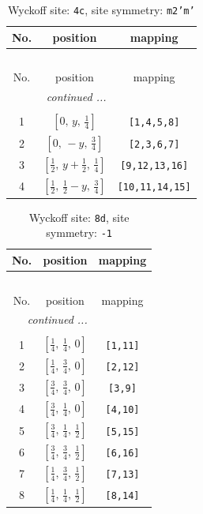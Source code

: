 \documentclass[fleqn,8pt]{jsarticle}
\begin{document}
\renewcommand{\arraystretch}{1.2}
\begin{longtable}{ccc}
\caption{Wyckoff site: {\tt 4c}, site symmetry: {\tt m2'm'}}
 \\
 \hline \hline
No. & position & mapping \\ \hline \endfirsthead

\multicolumn{2}{l}{\tablename\ \thetable{}} \\
 \hline \hline
No. & position & mapping \\ \hline \endhead

 \hline \hline
\multicolumn{2}{r}{\footnotesize\it continued ...} \\ \endfoot

 \hline \hline
\multicolumn{2}{r}{} \\ \endlastfoot

1 & $\left[ 0,\, y,\, \frac{1}{4} \right]$ & {\tt [1,4,5,8]} \\ \hline
2 & $\left[ 0,\, - y,\, \frac{3}{4} \right]$ & {\tt [2,3,6,7]} \\ \hline
3 & $\left[ \frac{1}{2},\, y + \frac{1}{2},\, \frac{1}{4} \right]$ & {\tt [9,12,13,16]} \\ \hline
4 & $\left[ \frac{1}{2},\, \frac{1}{2} - y,\, \frac{3}{4} \right]$ & {\tt [10,11,14,15]} \\
\end{longtable}
\renewcommand{\arraystretch}{1.2}
\begin{longtable}{ccc}
\caption{Wyckoff site: {\tt 8d}, site symmetry: {\tt -1}}
 \\
 \hline \hline
No. & position & mapping \\ \hline \endfirsthead

\multicolumn{2}{l}{\tablename\ \thetable{}} \\
 \hline \hline
No. & position & mapping \\ \hline \endhead

 \hline \hline
\multicolumn{2}{r}{\footnotesize\it continued ...} \\ \endfoot

 \hline \hline
\multicolumn{2}{r}{} \\ \endlastfoot

1 & $\left[ \frac{1}{4},\, \frac{1}{4},\, 0 \right]$ & {\tt [1,11]} \\ \hline
2 & $\left[ \frac{1}{4},\, \frac{3}{4},\, 0 \right]$ & {\tt [2,12]} \\ \hline
3 & $\left[ \frac{3}{4},\, \frac{3}{4},\, 0 \right]$ & {\tt [3,9]} \\ \hline
4 & $\left[ \frac{3}{4},\, \frac{1}{4},\, 0 \right]$ & {\tt [4,10]} \\ \hline
5 & $\left[ \frac{3}{4},\, \frac{1}{4},\, \frac{1}{2} \right]$ & {\tt [5,15]} \\ \hline
6 & $\left[ \frac{3}{4},\, \frac{3}{4},\, \frac{1}{2} \right]$ & {\tt [6,16]} \\ \hline
7 & $\left[ \frac{1}{4},\, \frac{3}{4},\, \frac{1}{2} \right]$ & {\tt [7,13]} \\ \hline
8 & $\left[ \frac{1}{4},\, \frac{1}{4},\, \frac{1}{2} \right]$ & {\tt [8,14]} \\
\end{longtable}
\end{document}
